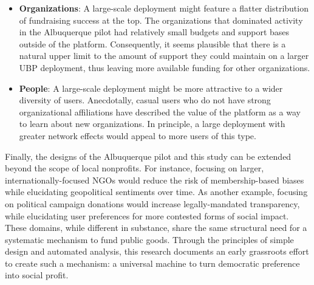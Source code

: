 \begin{itemize}

  \item \textbf{Organizations}: A large-scale deployment might feature a flatter distribution of fundraising success at the top.
    The organizations that dominated activity in the Albuquerque pilot had relatively small budgets and support bases outside of the platform.
    Consequently, it seems plausible that there is a natural upper limit to the amount of support they could maintain on a larger UBP deployment, thus leaving more available funding for other organizations.

  \item \textbf{People}: A large-scale deployment might be more attractive to a wider diversity of users.
Anecdotally, casual users who do not have strong organizational affiliations have described the value of the platform as a way to learn about new organizations.
In principle, a large deployment with greater network effects would appeal to more users of this type.

\end{itemize}

Finally, the designs of the Albuquerque pilot and this study can be extended beyond the scope of local nonprofits.
For instance, focusing on larger, internationally-focused NGOs would reduce the risk of membership-based biases while elucidating geopolitical sentiments over time.
As another example, focusing on political campaign donations would increase legally-mandated transparency, while elucidating user preferences for more contested forms of social impact.  
These domains, while different in substance, share the same structural need for a systematic mechanism to fund public goods.
Through the principles of simple design and automated analysis, this research documents an early grassroots effort to create such a mechanism: a universal machine to turn democratic preference into social profit.
